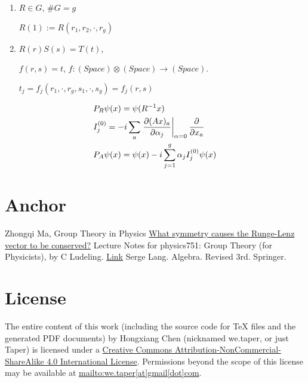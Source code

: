 \documentclass{article}
\begin{document}
\begin{enumerate}
    \item $R\in G$, $\# G=g$

        $ R(1):=R(r_1,r_2,\cdot,r_g)$
    \item $R(r)S(s)=T(t)$,

        $f(r,s)=t$, $f:(Space)\otimes(Space)\to (Space)$.

        

        $t_j = f_j(r_1,\cdot,r_g,s_1,\cdot,s_g)=f_j(r,s)$
\end{enumerate}

\begin{align}
    & P_R\psi(x)=\psi(R^{-1}x) \\
    & I^{(0)}_j = -i\sum_a 
        \eval{\frac{\partial (Ax)_a}{\partial \alpha_j}}_{\alpha=0}
        \frac{\partial }{\partial x_a} \\
    & P_A\psi(x) = \psi(x)-i\sum_{j=1}^g \alpha_j I^{(0)}_j\psi(x)
\end{align}
\section{Anchor}
\label{sec:Anchor}
\begin{thebibliography}{1}
     Zhongqi Ma, Group Theory in Physics
     \href{physics.stackexchange.com/questions/18088/what-symmetry-causes-the-runge-lenz-vector-to-be-conserved}{What symmetry causes the Runge-Lenz vector to be conserved?}
     Lecture Notes for physics751: Group Theory (for
    Physicists), by C Ludeling.
    \href{http://www.th.physik.uni-bonn.de/nilles/people/luedeling/grouptheory/data/grouptheorynotes.pdf}{Link}
     Serge Lang. Algebra. Revised 3rd. Springer.
\end{thebibliography}
\printnomenclature
\section{License}
The entire content of this work (including the source code
for TeX files and the generated PDF documents) by 
Hongxiang Chen (nicknamed we.taper, or just Taper) is
licensed under a 
\href{http://creativecommons.org/licenses/by-nc-sa/4.0/}{Creative 
Commons Attribution-NonCommercial-ShareAlike 4.0 International 
License}. Permissions beyond the scope of this 
license may be available at \url{mailto:we.taper[at]gmail[dot]com}.
\end{document}
